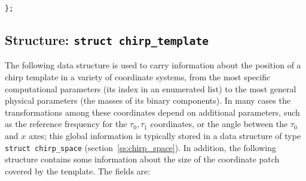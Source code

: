 {\tt \};}


\clearpage
\subsection{Structure: {\tt struct chirp\_template}}
\label{ss:chirp_template}

The following data structure is used to carry information about the
position of a chirp template in a variety of coordinate systems, from
the most specific computational parameters (its index in an enumerated
list) to the most general physical parameters (the masses of its
binary components).  In many cases the transformations among these
coordinates depend on additional parameters, such as the reference
frequency for the $\tau_0,\tau_1$ coordinates, or the angle between
the $\tau_0$ and $x$ axes; this global information is typically stored
in a data structure of type {\tt struct chirp\_space}
(section~\ref{ss:chirp_space}).  In addition, the following structure
contains some information about the size of the coordinate patch
covered by the template.  The fields are:

